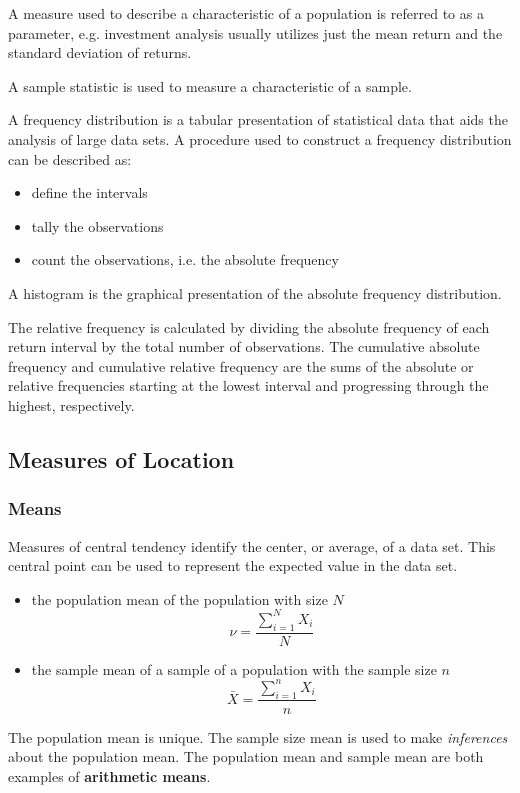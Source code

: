 A measure used to describe a characteristic of a population is referred to as a parameter, e.g. investment analysis usually utilizes just the mean return and the standard deviation of returns.

A sample statistic is used to measure a characteristic of a sample.

A frequency distribution is a tabular presentation of statistical data that aids the analysis of large data sets. A procedure used to construct a frequency distribution can be described as:
\begin{itemize}
	\setlength\itemsep{0em}
	\item define the intervals
	\item tally the observations
	\item count the observations, i.e. the absolute frequency
\end{itemize} 
A histogram is the graphical presentation of the absolute frequency distribution.

The relative frequency is calculated by dividing the absolute frequency of each return interval by the total number of observations. The cumulative absolute frequency and cumulative relative frequency are the sums of the absolute or relative frequencies starting at the lowest interval and progressing through the highest, respectively.



\subsection{Measures of Location}

\subsubsection{Means}
Measures of central tendency identify the center, or average, of a data set. This central point can be used to represent the expected value in the data set. 
\begin{itemize}
	\setlength\itemsep{0em}
	\item the population mean of the population with size $N$
	\begin{equation}
		\nu = \frac{\sum_{i=1}^N X_i}{N}
	\end{equation}
	\item the sample mean of a sample of a population with the sample size $n$
	\begin{equation}
		\bar{X} = \frac{\sum_{i=1}^n X_i}{n}
	\end{equation}
\end{itemize}
The population mean is unique. The sample size mean is used to make \textit{inferences} about the population mean. The population mean and sample mean are both examples of \textbf{arithmetic means}.

